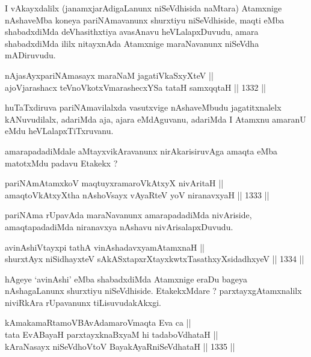 \begin{artha}
I vAkayxdalilx (janamxjarAdigaLanunx niSeVdhisida naMtara) Atamxnige nAshaveMba koneya pariNAmavanunx shurxtiyu niSeVdhiside, maqti eMba shabadxdiMda deVhasithxtiya avasAnavu heVLalapxDuvudu, amara shabadxdiMda ililx nitayxnAda Atamxnige maraNavanunx niSeVdha mADiruvudu.
\end{artha}

\begin{shl}
nAjasAyxpariNAmasayx maraNaM jagatiVkaSxyXteV || \\
ajoV\s jarashacx teVnoVkotxV\s marashecxYSa tataH samxqqtaH ||  1332 ||  
\end{shl}

\begin{artha}
huTaTxdiruva pariNAmavilalxda vasutxvige nAshaveMbudu jagatitxnalelx kANuvudilalx, adariMda aja, ajara eMdAguvanu, adariMda I Atamxnu amaranU eMdu heVLalapxTiTxruvanu.
\end{artha}

\begin{artha}
amarapadadiMdale aMtayxvikAravanunx nirAkarisiruvAga amaqta eMba matotxMdu padavu Etakekx ?
\end{artha}

\begin{shl}
pariNAmAtamxkoV maqtuyxramaroVkAtxyX nivAritaH || \\
amaqtoVkAtxyX\s tha nAshoV\s sayx vAyaRteV yoV niranavxyaH ||  1333 ||  
\end{shl}

\begin{artha}
pariNAma rUpavAda maraNavanunx amarapadadiMda nivAriside, amaqtapadadiMda niranavxya nAshavu nivArisalapxDuvudu.
\end{artha}

\begin{shl}
avinAshiVtayxpi tathA vinAshadavxyamAtamxnaH || \\
shurxtAyx niSidhayxteV sAkASxtapxrXtayxkwtxTasathxyXsidadhxyeV ||  1334 ||  
\end{shl}

\begin{artha}
hAgeye `avinAshi' eMba shabadxdiMda Atamxnige eraDu bageya nAshagaLanunx shurxtiyu niSeVdhiside. EtakekxMdare ? parxtayxgAtamxnalilx niviRkAra rUpavanunx tiLisuvudakAkxgi.
\end{artha}

\begin{shl}
kAmakamaRtamoVBAvAdamaroV\s maqta Eva ca || \\
tata EvABayaH parxtayxknaBxyaM hi tadaboVdhataH || \\
kAraNasayx niSeVdhoV\s toV BayakAyaRniSeVdhataH ||  1335 ||  
\end{shl}

